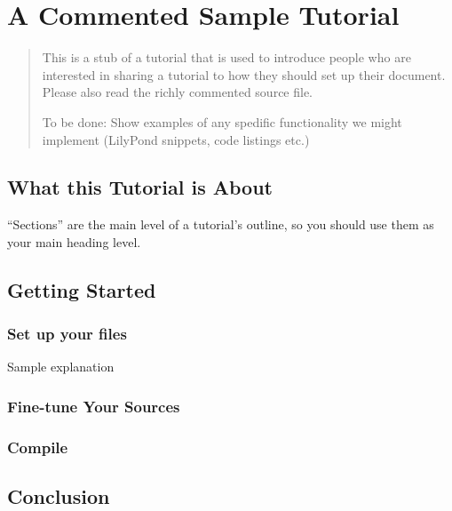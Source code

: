 \documentclass[../LilyPond-Tutorials]{subfiles}
\begin{document}
\chapter{A Commented Sample Tutorial}

\begin{abstract}
This is a stub of a tutorial that is used to introduce people who are interested in sharing a tutorial to how they should set up their document.
Please also read the richly commented source file.

To be done: Show examples of any spedific functionality we might implement (LilyPond snippets, code listings etc.)
\end{abstract}

\section{What this Tutorial is About}
“Sections” are the main level of a tutorial's outline, so you should use them as your main heading level.

\section{Getting Started}
\subsection{Set up your files}
Sample explanation

\subsection{Fine-tune Your Sources}

\subsection{Compile}

\section{Conclusion}
\end{document}
